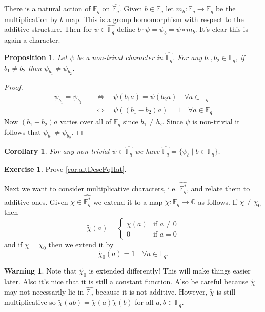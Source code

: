 \documentclass[11pt]{article}
\newcommand{\BB}[1]{\mathbb{#1}} %
\newcommand{\CC}{\BB{C}}
\newcommand{\FF}{\BB{F}}
\newcommand{\st}{\mid}
\renewcommand{\hat}{\widehat}
\theoremstyle{plain}
\newtheorem{prop}[propositionCounter]{Proposition}
\newtheorem{cor}[corollaryCounter]{Corollary}
\theoremstyle{definition}
\newtheorem{excer}[exerciseCounter]{Exercise}
\newtheorem{warn}[warniningCounter]{Warning}
\theoremstyle{remark}
\begin{document}
There is a natural action of $\FF_q$ on $\hat{\FF_q}$. Given $b\in \FF_q$ let $m_b:\FF_q\to \FF_q$ be the multiplication by $b$ map. This is a group homomorphism with respect to the additive structure. Then for $\psi\in\hat{\FF_q}$ define $b\cdot\psi = \psi_b = \psi\circ m_b$. It's clear this is again a character.

\begin{prop}
	 Let $\psi$ be a non-trival character in $\hat{\FF_q}$. For any $b_1,b_2\in\FF_q$, if $b_1\neq b_2$ then $\psi_{b_1}\neq \psi_{b_2}$.
\end{prop}
\begin{proof}
	\begin{align*}
		\psi_{b_1} = \psi_{b_2} \quad&\Leftrightarrow\quad \psi(b_1a) = \psi(b_2a) \quad\forall a\in\FF_q
		\\
		&\Leftrightarrow\quad \psi((b_1 - b_2)a) = 1 \quad\forall a\in\FF_q
	\end{align*}
	Now $(b_1 - b_2)a$ varies over all of $\FF_q$ since $b_1\neq b_2$. Since $\psi$ is non-trivial it follows that $\psi_{b_1}\neq\psi_{b_2}$.
\end{proof}

\begin{cor}\label{cor:altDescFqHat}
	For any non-trivial $\psi\in\hat{\FF_q}$ we have $\hat{\FF_q} = \{\psi_b \st b\in\FF_q \}$.
\end{cor}
\begin{excer}
	Prove \autoref{cor:altDescFqHat}.
\end{excer}

Next we want to consider multiplicative characters, i.e. $\hat{\FF_q^*}$, and relate them to additive ones. Given $\chi\in\hat{\FF_q^*}$ we extend it to a map $\widetilde{\chi}:\FF_q \to \CC$ as follows. If $\chi\neq\chi_0$ then
$$
\widetilde{\chi}(a) =
\begin{cases}
	\chi(a) &\text{if $a\neq 0$}
	\\
	0 &\text{if $a=0$}
\end{cases}
$$
and if $\chi = \chi_0$ then we extend it by
$$
\widetilde{\chi_0}(a) = 1 \quad \forall a\in\FF_q.
$$

\begin{warn}\label{warn:extensionsOfChars}
	Note that $\widetilde{\chi_0}$ is extended differently! This will make things easier later. Also it's nice that it is still a constant function. Also be careful because $\widetilde{\chi}$ may not necessarily lie in $\hat{\FF_q}$ because it is not additive. However, $\widetilde{\chi}$ is still multiplicative so $\widetilde{\chi}(ab) = \widetilde{\chi}(a)\widetilde{\chi}(b)$ for all $a,b\in\FF_q$.
\end{warn}
\end{document}
